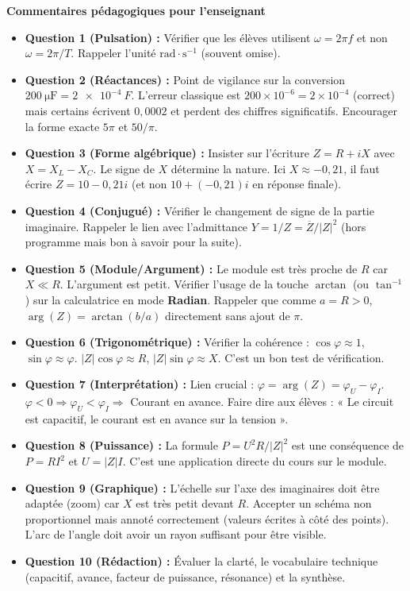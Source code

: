 \documentclass[11pt]{article}
\begin{document}
\begin{exoresolu}
\textbf{Commentaires pédagogiques pour l'enseignant}
\begin{itemize}
    \item \textbf{Question 1 (Pulsation) :} Vérifier que les élèves utilisent $\omega = 2\pi f$ et non $\omega = 2\pi/T$. Rappeler l'unité $\text{rad}\cdot\text{s}^{-1}$ (souvent omise).
    \item \textbf{Question 2 (Réactances) :} Point de vigilance sur la conversion $\SI{200}{\micro\farad} = \SI{2e-4}{F}$. L'erreur classique est $200 \times 10^{-6} = 2 \times 10^{-4}$ (correct) mais certains écrivent $0,0002$ et perdent des chiffres significatifs. Encourager la forme exacte $5\pi$ et $50/\pi$.
    \item \textbf{Question 3 (Forme algébrique) :} Insister sur l'écriture $Z = R + iX$ avec $X = X_L - X_C$. Le signe de $X$ détermine la nature. Ici $X \approx -0,21$, il faut écrire $Z = 10 - 0,21i$ (et non $10 + (-0,21)i$ en réponse finale).
    \item \textbf{Question 4 (Conjugué) :} Vérifier le changement de signe de la partie imaginaire. Rappeler le lien avec l'admittance $Y = 1/Z = \overline{Z}/|Z|^2$ (hors programme mais bon à savoir pour la suite).
    \item \textbf{Question 5 (Module/Argument) :} Le module est très proche de $R$ car $X \ll R$. L'argument est petit. Vérifier l'usage de la touche $\arctan$ (ou $\tan^{-1}$) sur la calculatrice en mode \textbf{Radian}. Rappeler que comme $a=R>0$, $\arg(Z) = \arctan(b/a)$ directement sans ajout de $\pi$.
    \item \textbf{Question 6 (Trigonométrique) :} Vérifier la cohérence : $\cos\varphi \approx 1$, $\sin\varphi \approx \varphi$. $|Z|\cos\varphi \approx R$, $|Z|\sin\varphi \approx X$. C'est un bon test de vérification.
    \item \textbf{Question 7 (Interprétation) :} Lien crucial : $\varphi = \arg(Z) = \varphi_U - \varphi_I$. $\varphi < 0 \Rightarrow \varphi_U < \varphi_I \Rightarrow$ Courant en avance. Faire dire aux élèves : « Le circuit est capacitif, le courant est en avance sur la tension ».
    \item \textbf{Question 8 (Puissance) :} La formule $P = U^2 R / |Z|^2$ est une conséquence de $P = R I^2$ et $U = |Z|I$. C'est une application directe du cours sur le module.
    \item \textbf{Question 9 (Graphique) :} L'échelle sur l'axe des imaginaires doit être adaptée (zoom) car $X$ est très petit devant $R$. Accepter un schéma non proportionnel mais annoté correctement (valeurs écrites à côté des points). L'arc de l'angle doit avoir un rayon suffisant pour être visible.
    \item \textbf{Question 10 (Rédaction) :} Évaluer la clarté, le vocabulaire technique (capacitif, avance, facteur de puissance, résonance) et la synthèse.
\end{itemize}

\end{exoresolu}
\end{document}
